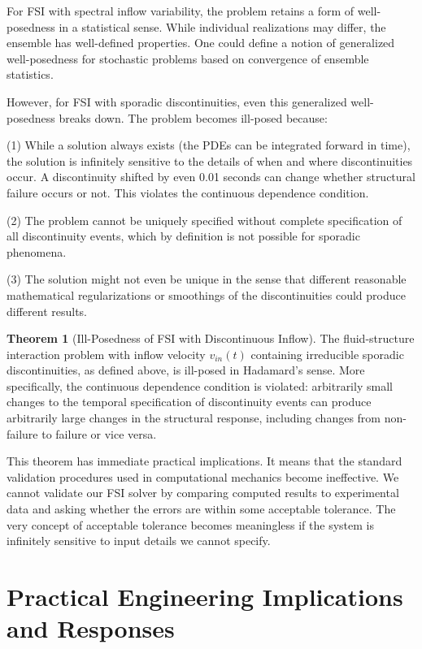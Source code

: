 ﻿\documentclass[a4paper,11pt]{article}
\theoremstyle{definition}
\newtheorem{theorem}{Theorem}
\begin{document}
For FSI with spectral inflow variability, the problem retains a form of well-posedness in a statistical sense. While individual realizations may differ, the ensemble has well-defined properties. One could define a notion of generalized well-posedness for stochastic problems based on convergence of ensemble statistics.

However, for FSI with sporadic discontinuities, even this generalized well-posedness breaks down. The problem becomes ill-posed because:

(1) While a solution always exists (the PDEs can be integrated forward in time), the solution is infinitely sensitive to the details of when and where discontinuities occur. A discontinuity shifted by even 0.01 seconds can change whether structural failure occurs or not. This violates the continuous dependence condition.

(2) The problem cannot be uniquely specified without complete specification of all discontinuity events, which by definition is not possible for sporadic phenomena.

(3) The solution might not even be unique in the sense that different reasonable mathematical regularizations or smoothings of the discontinuities could produce different results.

\begin{theorem}[Ill-Posedness of FSI with Discontinuous Inflow]
The fluid-structure interaction problem with inflow velocity $v_{in}(t)$ containing irreducible sporadic discontinuities, as defined above, is ill-posed in Hadamard's sense. More specifically, the continuous dependence condition is violated: arbitrarily small changes to the temporal specification of discontinuity events can produce arbitrarily large changes in the structural response, including changes from non-failure to failure or vice versa.
\end{theorem}

This theorem has immediate practical implications. It means that the standard validation procedures used in computational mechanics become ineffective. We cannot validate our FSI solver by comparing computed results to experimental data and asking whether the errors are within some acceptable tolerance. The very concept of acceptable tolerance becomes meaningless if the system is infinitely sensitive to input details we cannot specify.

\section{Practical Engineering Implications and Responses}
\end{document}
